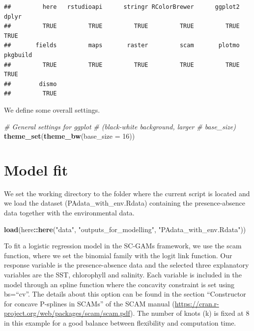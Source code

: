 \documentclass[
]{book}
\newenvironment{Shaded}{\begin{snugshade}}{\end{snugshade}}
\newcommand{\AttributeTok}[1]{\textcolor[rgb]{0.13,0.29,0.53}{#1}}
\newcommand{\CommentTok}[1]{\textcolor[rgb]{0.56,0.35,0.01}{\textit{#1}}}
\newcommand{\DecValTok}[1]{\textcolor[rgb]{0.00,0.00,0.81}{#1}}
\newcommand{\FunctionTok}[1]{\textcolor[rgb]{0.13,0.29,0.53}{\textbf{#1}}}
\newcommand{\NormalTok}[1]{#1}
\newcommand{\SpecialCharTok}[1]{\textcolor[rgb]{0.81,0.36,0.00}{\textbf{#1}}}
\newcommand{\StringTok}[1]{\textcolor[rgb]{0.31,0.60,0.02}{#1}}
\begin{document}
\begin{verbatim}
##         here   rstudioapi      stringr RColorBrewer      ggplot2        dplyr 
##         TRUE         TRUE         TRUE         TRUE         TRUE         TRUE 
##       fields         maps       raster         scam       plotmo     pkgbuild 
##         TRUE         TRUE         TRUE         TRUE         TRUE         TRUE 
##        dismo 
##         TRUE
\end{verbatim}

We define some overall settings.

\begin{Shaded}
\begin{Highlighting}[]
\CommentTok{\# General settings for ggplot}
\CommentTok{\# (black{-}white background, larger}
\CommentTok{\# base\_size)}
\FunctionTok{theme\_set}\NormalTok{(}\FunctionTok{theme\_bw}\NormalTok{(}\AttributeTok{base\_size =} \DecValTok{16}\NormalTok{))}
\end{Highlighting}
\end{Shaded}

\section{Model fit}\label{model-fit}

We set the working directory to the folder where the current script is located and we load the dataset (PAdata\_with\_env.Rdata) containing the presence-absence data together with the environmental data.

\begin{Shaded}
\begin{Highlighting}[]
\FunctionTok{load}\NormalTok{(here}\SpecialCharTok{::}\FunctionTok{here}\NormalTok{(}\StringTok{"data"}\NormalTok{, }\StringTok{"outputs\_for\_modelling"}\NormalTok{,}
    \StringTok{"PAdata\_with\_env.Rdata"}\NormalTok{))}
\end{Highlighting}
\end{Shaded}

To fit a logistic regression model in the SC-GAMs framework, we use the scam function, where we set the binomial family with the logit link function. Our response variable is the presence-absence data and the selected three explanatory variables are the SST, chlorophyll and salinity. Each variable is included in the model through an spline function where the concavity constraint is set using bs=``cv''. The details about this option can be found in the section ``Constructor for concave P-splines in SCAMs'' of the SCAM manual (\url{https://cran.r-project.org/web/packages/scam/scam.pdf}). The number of knots (k) is fixed at 8 in this example for a good balance between flexibility and computation time.
\end{document}
